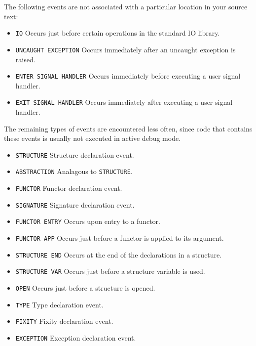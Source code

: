 The following events are not associated with a particular location in
your source text:

\begin{itemize}
\item{\verb'IO'}
Occurs just before certain operations in the standard IO library.

\item{\verb'UNCAUGHT EXCEPTION'}
Occurs immediately after an uncaught exception is raised.

\item{\verb'ENTER SIGNAL HANDLER'}
Occurs immediately before executing a user signal handler.

\item{\verb'EXIT SIGNAL HANDLER'}
Occurs immediately after executing a user signal handler.

\end{itemize}

The remaining types of events are encountered less often, since code
that contains these events is usually not executed in active debug mode.

\begin{itemize}
\item{\verb'STRUCTURE'} Structure declaration event.

\item{\verb'ABSTRACTION'} Analagous to \verb'STRUCTURE'.

\item{\verb'FUNCTOR'} Functor declaration event.

\item{\verb'SIGNATURE'} Signature declaration event.

\item{\verb'FUNCTOR ENTRY'} Occurs upon entry to a functor.

\item{\verb'FUNCTOR APP'} Occurs just before a functor is applied to its
argument.

\item{\verb'STRUCTURE END'} Occurs at the end of the declarations in a
structure.

\item{\verb'STRUCTURE VAR'} Occurs just before a structure variable is used.

\item{\verb'OPEN'} Occurs just before a structure is opened.

\item{\verb'TYPE'} Type declaration event.

\item{\verb'FIXITY'} Fixity declaration event.

\item{\verb'EXCEPTION'} Exception declaration event.

\end{itemize}

